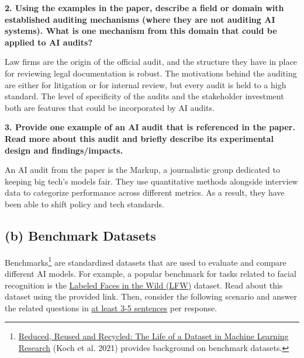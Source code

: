\documentclass{article}
\begin{document}
\textbf{2. Using the examples in the paper, describe a field or domain with established auditing mechanisms (where they are not auditing AI systems). What is one mechanism from this domain that could be applied to AI audits?}
\bigskip
\begin{mdframed}

    Law firms are the origin of the official audit, and the structure they have in place for reviewing legal documentation is robust. The motivations behind the auditing are either for litigation or for internal review, but every audit is held to 
    a high standard. The level of specificity of the audits and the stakeholder investment 
    both are features that could be incorporated by AI audits.

\end{mdframed}
\bigskip

\textbf{3. Provide one example of an AI audit that is referenced in the paper. Read more about this audit and briefly describe its experimental design and findings/impacts.}
\bigskip
\begin{mdframed}

    An AI audit from the paper is the Markup, a journalistic group dedicated to keeping big tech's models
    fair. They use quantitative methods alongside interview data to categorize performance across different metrics.
    As a result, they have been able to shift policy and tech standards.

\end{mdframed}
\bigskip

\subsection*{(b) Benchmark Datasets}



Benchmarks\footnote{\href{https://arxiv.org/pdf/2112.01716}{Reduced, Reused and Recycled: The Life of a Dataset in Machine Learning Research} (Koch et al. 2021) provides background on benchmark datasets.} are standardized datasets that are used to evaluate and compare different AI models. For example, a popular benchmark for tasks related to facial recognition is the \href{https://vis-www.cs.umass.edu/lfw/}{Labeled Faces in the Wild (LFW)} dataset. Read about this dataset using the provided link. Then, consider the following scenario and answer the related questions in \underline{at least 3-5 sentences} per response.

\bigskip
\end{document}
